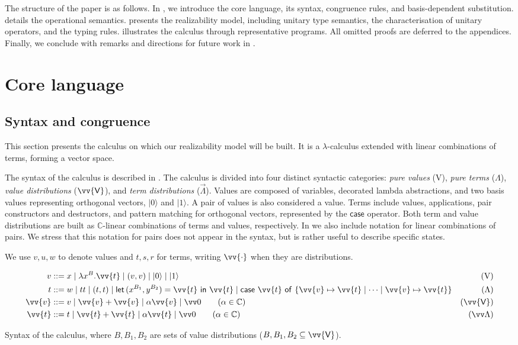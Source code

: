 \documentclass[runningheads,orivec,envcountsame,envcountsect]{llncs}
\newcommand\ket[1]{\ensuremath{|#1\rangle}}
\newcommand\s[1]{\ensuremath{\mathsf{#1}}}
\newcommand\Val{{\s V}}
\DeclareRobustCommand{\ValD}{\ensuremath{\vv{\mathsf{V}}}}
\def\C{\mathbb{C}}            %
\def\Val{\mathrm{V}}          %
\def\Pair#1#2{(#1,#2)} %
\def\Lam#1#2#3{\lambda#1^{#2}{.}#3} %
\def\letkeyword{\mathsf{let}}
\def\inkeyword{\mathsf{in}}
\def\LetP#1#2#3#4#5#6{\letkeyword\,\Pair{#1^{#2}}{#3^{#4}}=#5~\inkeyword~#6}
\def\gencase#1#2#3#4#5{\ensuremath{\mathsf{case}~#1~\mathsf{of}~\{#2\mapsto #4 \mid \dotsb \mid #3\mapsto #5\}}}
\begin{document}
The structure of the paper is as follows.  In
, we introduce the core
language, its syntax, congruence rules, and basis-dependent substitution.
 details the
operational semantics.  
presents the realizability model, including
unitary type semantics, the characterisation of unitary operators, and the
typing rules.   illustrates the
calculus through representative programs.  All omitted proofs are deferred to
the appendices.  Finally, we conclude with remarks and directions for future
work in .

\section{Core language}\label{sec:calculus}
\subsection{Syntax and congruence}
This section presents the calculus on which our realizability model will be
built. It is a $\lambda$-calculus extended with linear combinations of terms,
forming a vector space. 

The syntax of the calculus is described in
. The calculus is divided into four
distinct syntactic categories: \emph{pure values} ($\Val$), \emph{pure terms}
($\Lambda$), \emph{value distributions} ($\ValD$), and \emph{term
distributions} ($\vec\Lambda$). Values are composed of variables, decorated
lambda abstractions, and two basis values representing orthogonal vectors,
$\ket 0$ and $\ket 1$. A pair of values is also considered a value.  Terms
include values, applications, pair constructors and destructors, and pattern
matching for orthogonal vectors, represented by the $\mathsf{case}$ operator.
Both term and value distributions are built as $\C$-linear combinations of
terms and values, respectively. In 
we also include notation for linear combinations of
pairs. We stress that this notation for pairs does not appear in the syntax,
but is rather useful to describe specific states.

We use $v,u,w$ to denote values and $t,s,r$ for terms, writing $\vv{\cdot}$ when
they are distributions.

\begin{table}[t]
  \begin{align*}
    v &::= x \mid \Lam{x}B{\vv{t}} \mid (v, v) \mid \ket{0} \mid \ket{1} &
    (\Val)\\
    t &::= w \mid tt \mid (t,t) \mid
    \LetP{x}{B_1}{y}{B_2}{\vv{t}}{\vv{t}}\mid
    \gencase{\vv{t}}{\vv{v}}{\vv{v}}{\vv{t}}{\vv{t}} &
    (\Lambda) \\
    \vv{v} &::= v \mid \vv{v}+\vv{v} \mid \alpha \vv{v} \mid \vv 0
    \qquad\hfill(\alpha\in\C) & (\ValD) \\
    \vv{t} &::= t \mid \vv{t}+\vv{t} \mid \alpha \vv{t} \mid \vv 0
    \qquad\hfill(\alpha\in\C) & (\vv \Lambda)
  \end{align*}
  \caption{Syntax of the calculus, where $B, B_1, B_2$ are sets of value
  distributions ($B, B_1, B_2 \subseteq \ValD$).}
  \label{tab:Syntax}
\end{table}
\end{document}
